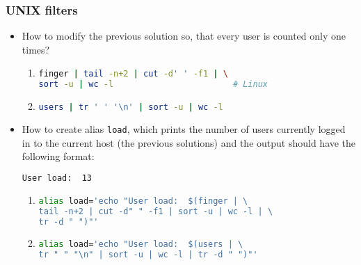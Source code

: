 \begin{frame}[fragile]
\frametitle{UNIX filters}
	\begin{itemize}
	
		\item How to modify the previous solution so, that every user is counted only one times?
		
		\begin{enumerate}
			\item
\begin{footnotesize}
\begin{lstlisting}[language=bash]		
finger | tail -n+2 | cut -d' ' -f1 | \
sort -u | wc -l                        # Linux
\end{lstlisting}
\end{footnotesize}

			\item
\begin{footnotesize}
\begin{lstlisting}[language=bash]		
users | tr ' ' '\n' | sort -u | wc -l
\end{lstlisting}
\end{footnotesize}

		\end{enumerate}

		\item How to create alias \texttt{load}, which prints the number of users currently logged in to the current host (the previous solutions)
			 and the output should have the following format:

\begin{lstlisting}[language=bash,showspaces=true]		
User load:  13
\end{lstlisting}
	
		\begin{enumerate}
			\item
\begin{footnotesize}
\begin{lstlisting}[language=bash]
alias load='echo "User load:  $(finger | \
tail -n+2 | cut -d" " -f1 | sort -u | wc -l | \
tr -d " ")"'
\end{lstlisting}
\end{footnotesize}

			\item
\begin{footnotesize}
\begin{lstlisting}[language=bash]		
alias load='echo "User load:  $(users | \
tr " " "\n" | sort -u | wc -l | tr -d " ")"'
\end{lstlisting}
\end{footnotesize}

		\end{enumerate}

	\end{itemize}
\end{frame}

